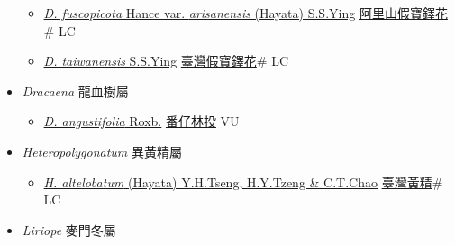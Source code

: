 \begin{itemize}
  \begin{itemize}
        \item[] \href{http://www.theplantlist.org/tpl1.1/search?q=Disporopsis+fuscopicota+var.+arisanensis}{\textit{D. fuscopicota} Hance var. \textit{arisanensis} (Hayata) S.S.Ying}   \href{\detokenize{http://taibnet.sinica.edu.tw/chi/taibnet_species_list.php?T2=阿里山假寶鐸花&T2_new_value=true&fr=y}}{阿里山假寶鐸花}\# LC
        \item[] \href{http://www.theplantlist.org/tpl1.1/search?q=Disporopsis+taiwanensis}{\textit{D. taiwanensis} S.S.Ying}   \href{\detokenize{http://taibnet.sinica.edu.tw/chi/taibnet_species_list.php?T2=臺灣假寶鐸花&T2_new_value=true&fr=y}}{臺灣假寶鐸花}\# LC
  \end{itemize}
 \item[] \textit{Dracaena} 龍血樹屬
                    
  \begin{itemize}
        \item[] \href{http://www.theplantlist.org/tpl1.1/search?q=Dracaena+angustifolia}{\textit{D. angustifolia} Roxb.}   \href{\detokenize{http://taibnet.sinica.edu.tw/chi/taibnet_species_list.php?T2=番仔林投&T2_new_value=true&fr=y}}{番仔林投} VU
  \end{itemize}
 \item[] \textit{Heteropolygonatum} 異黃精屬
                    
  \begin{itemize}
        \item[] \href{http://www.theplantlist.org/tpl1.1/search?q=Heteropolygonatum+altelobatum}{\textit{H. altelobatum} (Hayata) Y.H.Tseng, H.Y.Tzeng \& C.T.Chao}     \href{\detokenize{http://taibnet.sinica.edu.tw/chi/taibnet_species_list.php?T2=臺灣黃精&T2_new_value=true&fr=y}}{臺灣黃精}\# LC
  \end{itemize}
 \item[] \textit{Liriope} 麥門冬屬
                    

\end{itemize}
